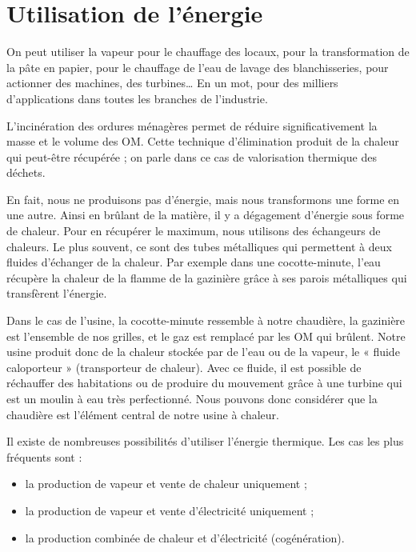 \section{Utilisation de l'énergie}


On peut utiliser la vapeur pour le chauffage des locaux, pour la transformation de la pâte en papier, pour le chauffage de l’eau de lavage des blanchisseries, pour actionner des machines, des turbines… En un mot, pour des milliers d’applications dans toutes les branches de l’industrie.
\vspace{0.3cm}

L’incinération des ordures ménagères permet de réduire significativement la masse et le volume des OM. Cette technique d’élimination produit de la chaleur qui peut-être récupérée ; on parle dans ce cas de valorisation thermique des déchets.
\vspace{0.3cm}

En fait, nous ne produisons pas d’énergie, mais nous transformons une forme en une autre. Ainsi en brûlant de la matière, il y a dégagement d’énergie sous forme de chaleur. Pour en récupérer le maximum, nous utilisons des échangeurs de chaleurs. Le plus souvent, ce sont des tubes métalliques qui permettent à deux fluides d’échanger de la chaleur. Par exemple dans une cocotte-minute, l’eau récupère la chaleur de la flamme de la gazinière grâce à ses parois métalliques qui transfèrent l’énergie.
\vspace{0.3cm}

Dans le cas de l’usine, la cocotte-minute ressemble à notre chaudière, la gazinière est l’ensemble de nos grilles, et le gaz est remplacé par les OM qui brûlent. Notre usine produit donc de la chaleur stockée par de l’eau ou de la vapeur, le « fluide caloporteur » (transporteur de chaleur). Avec ce fluide, il est possible de réchauffer des habitations ou de produire du mouvement grâce à une turbine qui est un moulin à eau très perfectionné.
Nous pouvons donc considérer que la chaudière est l’élément central de notre usine à chaleur.
\vspace{0.3cm}

Il existe de nombreuses possibilités d’utiliser l’énergie thermique. Les cas les plus fréquents sont :

\begin{itemize}
\item la production de vapeur et vente de chaleur uniquement ;
\item  la production de vapeur et vente d’électricité uniquement ;
\item  la production combinée de chaleur et d’électricité (cogénération).
\end{itemize}




